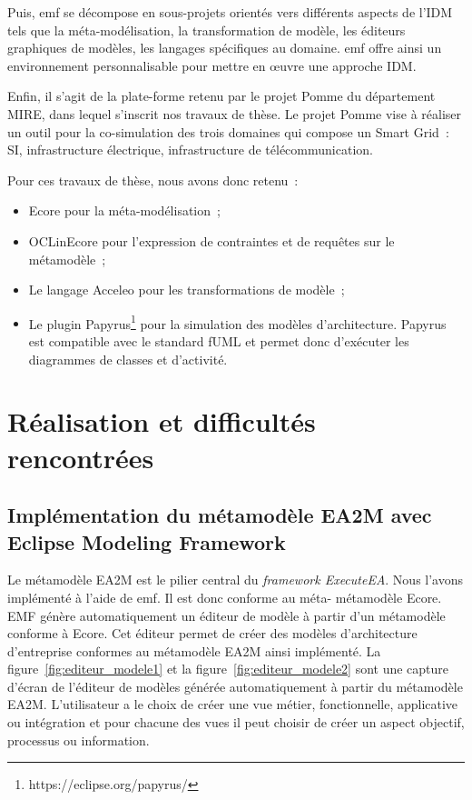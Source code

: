 Puis, \gls{emf} se décompose en sous-projets orientés vers différents aspects de
l'IDM tels que la méta-modélisation, la transformation de modèle, les éditeurs
graphiques de modèles, les langages spécifiques au domaine. \gls{emf} offre
ainsi un environnement personnalisable pour mettre en œuvre une approche IDM.

Enfin, il s'agit de la plate-forme retenu par le projet Pomme du département
MIRE, dans lequel s'inscrit nos travaux de thèse. Le projet Pomme vise à
réaliser un outil pour la co-simulation des trois domaines qui compose un Smart
Grid~: SI, infrastructure électrique, infrastructure de télécommunication.

Pour ces travaux de thèse, nous avons donc retenu~:

\begin{itemize}

    \item Ecore pour la méta-modélisation~;

    \item OCLinEcore pour l'expression de contraintes et de requêtes sur le métamodèle~;

    \item Le langage Acceleo pour les transformations de modèle~;

    \item Le plugin Papyrus\footnote{https://eclipse.org/papyrus/} pour la simulation
    des modèles d'architecture. Papyrus est compatible avec le standard fUML et
    permet donc d'exécuter les diagrammes de classes et d'activité. 

\end{itemize}


\section{Réalisation et difficultés rencontrées}
\label{sec:realisation_difficultes}
    \subsection{Implémentation du métamodèle EA2M avec Eclipse Modeling Framework}

    Le métamodèle EA2M est le pilier central du \emph{framework ExecuteEA}. Nous
    l'avons implémenté à l'aide de \gls{emf}. Il est donc conforme au méta-
    métamodèle Ecore. EMF génère automatiquement un éditeur de modèle à partir
    d'un métamodèle conforme à Ecore. Cet éditeur permet de créer des modèles
    d'architecture d'entreprise conformes au métamodèle EA2M ainsi implémenté.
    La figure~\ref{fig:editeur_modele1} et la figure~\ref{fig:editeur_modele2}
    sont une capture d'écran de l'éditeur de modèles générée automatiquement à
    partir du métamodèle EA2M. L'utilisateur a le choix de créer une vue métier,
    fonctionnelle, applicative ou intégration et pour chacune des vues il peut
    choisir de créer un aspect objectif, processus ou information.


